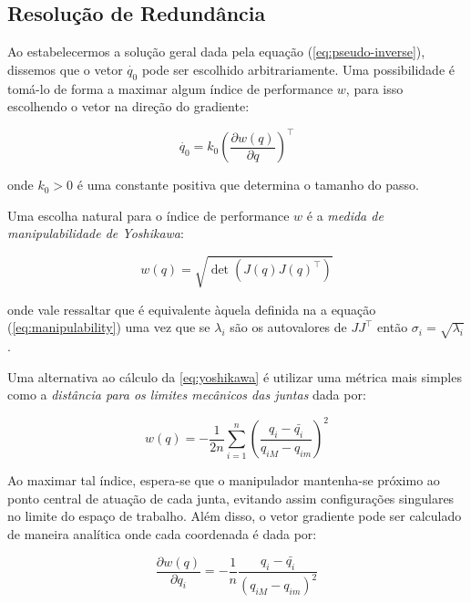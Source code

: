\subsection{Resolução de Redundância}

Ao estabelecermos a solução geral dada pela equação (\ref{eq:pseudo-inverse}),
dissemos que o vetor \(\dot{q_0}\) pode ser escolhido arbitrariamente. Uma
possibilidade é tomá-lo de forma a maximar algum índice de performance \(w\),
para isso escolhendo o vetor na direção do gradiente:

\begin{equation}\label{eq:metric-gradient}
    \dot{q_0} = k_0 {\left( \frac{\partial w(q)}{\partial q} \right)}^\top
\end{equation}

onde \(k_0 > 0\) é uma constante positiva que determina o tamanho do passo.

Uma escolha natural para o índice de performance \(w\) é a \emph{medida de
    manipulabilidade de Yoshikawa}:

\begin{equation}\label{eq:yoshikawa}
    w(q) = \sqrt{\det(J(q){J(q)}^\top)}
\end{equation}

onde vale ressaltar que é equivalente àquela definida na a equação
(\ref{eq:manipulability}) uma vez que se \(\lambda_i\) são os autovalores de
\(J J^\top\) então \(\sigma_i = \sqrt{\lambda_i}\).

Uma alternativa ao cálculo da \ref{eq:yoshikawa} é utilizar uma métrica mais simples como a
\emph{distância para os limites mecânicos das juntas} dada por:

\begin{equation}
    w(q) = -\frac{1}{2n} \sum_{i=1}^{n}{{\left(\frac{q_i - \bar{q_i}}{q_{iM} - q_{im}}\right)}^2}
\end{equation}

Ao maximar tal índice, espera-se que o manipulador mantenha-se próximo ao ponto
central de atuação de cada junta, evitando assim configurações singulares no
limite do espaço de trabalho. Além disso, o vetor gradiente pode ser calculado
de maneira analítica onde cada coordenada é dada por:

\begin{equation}\label{eq:joint-distance-grad}
    \frac{\partial w(q)}{\partial q_i} = -\frac{1}{n} \frac{q_i - \bar{q_i}}{{(q_{iM} - q_{im})}^2}
\end{equation}

